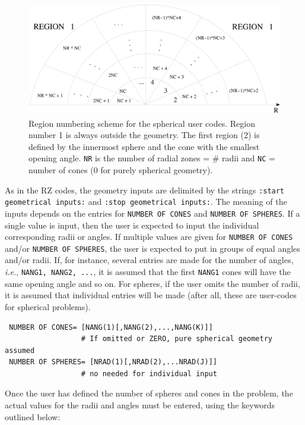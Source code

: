 \documentclass[12pt,twoside]{article}  %
\newcommand{\ie}{{\em i.e.}}
\begin{document}
\begin{figure}[hbt]
\begin{center}
\includegraphics[height=5cm]{figures/spherical}
\end{center}
\caption[Spherical geometry]{Region numbering scheme for the spherical
user codes.  Region number 1 is always outside the geometry. The first
region (2) is defined by the innermost sphere and the cone with the
smallest opening angle. {\tt NR} is the number of radial zones = \# radii
and {\tt NC} = number of cones (0 for purely spherical geometry). }
\label{fig_spherical}
\end{figure}

As in the RZ codes, the geometry inputs are delimited by the strings
{\tt :start geometrical inputs:} and {\tt:stop geometrical inputs:}. The
meaning of the inputs depends on the entries for {\tt NUMBER OF CONES}  and
{\tt NUMBER OF SPHERES}. If a single value is input, then the user is
expected to input the individual corresponding radii or angles. If multiple
values are given for {\tt NUMBER OF CONES}  and/or {\tt NUMBER OF SPHERES},
the user is expected to put in groups of equal angles and/or radii.
If, for instance, several
entries are made for the number of angles, \ie, {\tt NANG1, NANG2, ...}, it
is assumed that the first {\tt NANG1} cones will have the same opening angle
and so on. For spheres, if the user omits the number of radii, it is
assumed that individual entries will be made (after all,
these are user-codes for spherical problems).

\begin{verbatim}
 NUMBER OF CONES= [NANG(1)[,NANG(2),...,NANG(K)]] 
                  # If omitted or ZERO, pure spherical geometry assumed
 NUMBER OF SPHERES= [NRAD(1)[,NRAD(2),...NRAD(J)]] 
                  # no needed for individual input
\end{verbatim}

Once the user has defined the number of spheres and cones in the problem, the
actual values for the radii and angles must be entered, using the keywords
outlined below:
\end{document}

